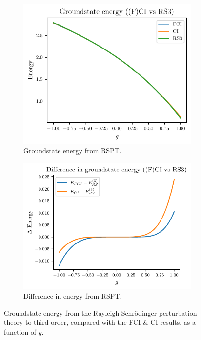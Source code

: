 \begin{figure}[htbp]
    \centering
    \begin{subfigure}[b]{0.45\textwidth}
        \centering
        \includegraphics[width=\textwidth]{figures/e_groundstate_energy_RS.pdf}
        \caption{
            Groundstate energy from RSPT.\label{fig:rs_energy}
        }
    \end{subfigure}
    \hfill
    \begin{subfigure}[b]{0.5\textwidth}
        \centering
        \includegraphics[width=\textwidth]{figures/e_groundstate_energy_diff_RS.pdf}
        \caption{
            Difference in energy from RSPT.\label{fig:rs_diff}
        }
    \end{subfigure}
    \caption{
        Groundstate energy from the Rayleigh-Schr\"odinger perturbation theory to third-order, compared with the FCI \& CI results, as a function of $g$.
    }
\end{figure}
